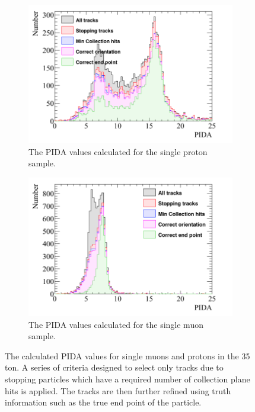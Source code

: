 \begin{figure}[h!]
  \centering
  \begin{subfigure}{0.48\textwidth}
        \centering
        \includegraphics[width=\textwidth]{IsolatedProtons_500V_Dec16_Proton_PIDA}
        \caption{The PIDA values calculated for the single proton sample.}
        \label{fig:Isol_PIDA_Proton}
  \end{subfigure}%
  \hspace{0.03\textwidth}%
  \begin{subfigure}{0.48\textwidth}
        \centering
        \includegraphics[width=\textwidth]{IsolatedMuons_500V_Dec16_Muon_PIDA}
        \caption{The PIDA values calculated for the single muon sample.}
        \label{fig:Isol_PIDA_Muon}
  \end{subfigure}
  \caption[The calculated PIDA values for single muons and protons in the 35 ton.]
          {The calculated PIDA values for single muons and protons in the 35 ton. A series of criteria designed to select only tracks due to stopping particles which have a required number of collection plane hits is applied. The tracks are then further refined using truth information such as the true end point of the particle.}
  \label{fig:Isol_PIDA}
\end{figure}

